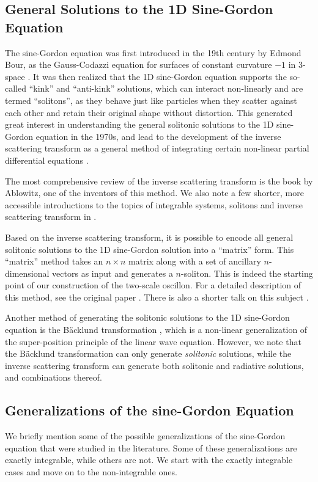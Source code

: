 \documentclass{report}
\begin{document}
\subsection{General Solutions to the 1D Sine-Gordon Equation}

The sine-Gordon equation was first introduced in the 19th century by Edmond Bour, as the Gauss-Codazzi equation for surfaces of constant curvature $-1$ in 3-space \cite{bour}. It was then realized that the 1D sine-Gordon equation supports the so-called ``kink'' and ``anti-kink'' solutions, which can interact non-linearly \cite{Perring:1962vs} and are termed ``solitons'', as they behave just like particles when they scatter against each other and retain their original shape without distortion. This generated great interest in understanding the general solitonic solutions to the 1D sine-Gordon equation in the 1970s, and lead to the development of the inverse scattering transform as a general method of integrating certain non-linear partial differential equations \cite{SAPM:SAPM1974534249}.

The most comprehensive review of the inverse scattering transform is the book \cite{ablowitz} by Ablowitz, one of the inventors of this method. We also note a few shorter, more accessible introductions to the topics of integrable systems, solitons and inverse scattering transform in \cite{Aktosun2009, spiro, intsys}.

Based on the inverse scattering transform, it is possible to encode all general solitonic solutions to the 1D sine-Gordon solution into a ``matrix'' form. This ``matrix'' method takes an $n\times n$ matrix along with a set of ancillary $n$-dimensional vectors as input and generates a $n$-soliton. This is indeed the starting point of our construction of the two-scale oscillon. For a detailed description of this method, see the original paper \cite{:/content/aip/journal/jmp/51/12/10.1063/1.3520596}. There is also a shorter talk on this subject \cite{sgtalk}.

Another method of generating the solitonic solutions to the 1D sine-Gordon equation is the B\"acklund transformation \cite{Dodd499, hietarinta1997introduction, Cuenda20111047}, which is a non-linear generalization of the super-position principle of the linear wave equation. However, we note that the B\"acklund transformation can only generate \emph{solitonic} solutions, while the inverse scattering transform can generate both solitonic and radiative solutions, and combinations thereof.

\subsection{Generalizations of the sine-Gordon Equation}
We briefly mention some of the possible generalizations of the sine-Gordon equation that were studied in the literature. Some of these generalizations are exactly integrable, while others are not. We start with the exactly integrable cases and move on to the non-integrable ones.
\end{document}
